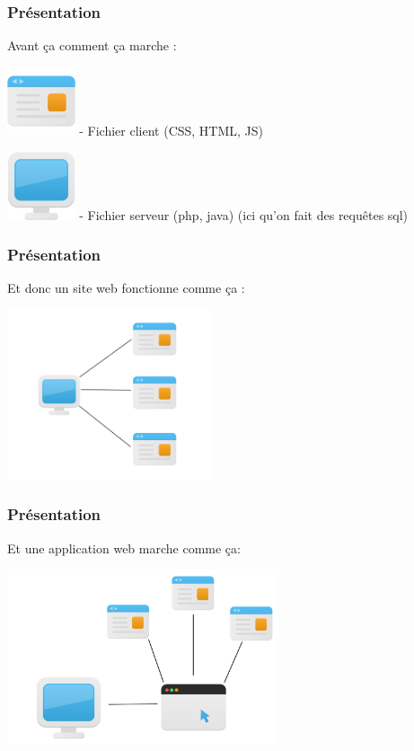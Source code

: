 \documentclass[10pt]{beamer}
\begin{document}
	\begin{frame}
		\frametitle{Présentation}

		Avant ça comment ça marche :

			\includegraphics[width=2cm]{assets/page}\newline
			- Fichier client (CSS, HTML, JS)

			\includegraphics[width=2cm]{assets/server}\newline
			- Fichier serveur (php, java) (ici qu'on fait des requêtes sql)

	\end{frame}

	\begin{frame}
		\frametitle{Présentation}

		Et donc un site web fonctionne comme ça :
		\newline \newline

		\centering
		\includegraphics[width=6cm]{assets/siteweb}\newline

	\end{frame}

	\begin{frame}
		\frametitle{Présentation}

		Et une application web marche comme ça:
		\newline \newline

		\centering
		\includegraphics[width=8cm]{assets/appweb}\newline

	\end{frame}
\end{document}
